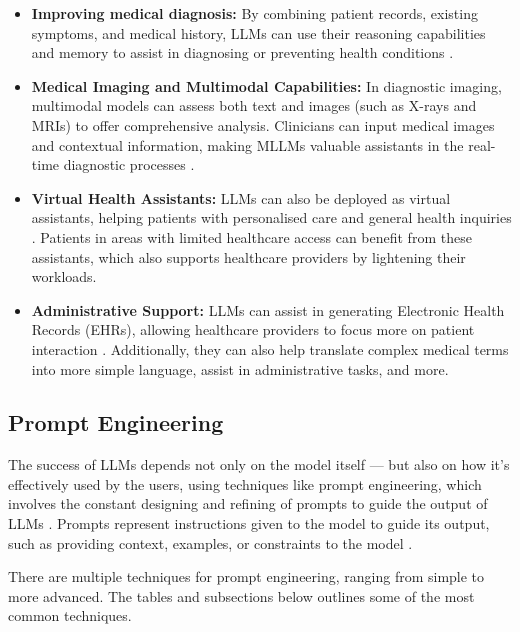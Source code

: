 \begin{itemize}
    \item \textbf{Improving medical diagnosis:} By combining patient records, existing symptoms, and medical history, LLMs can use their reasoning capabilities and memory to assist in diagnosing or preventing health conditions \parencite{llm_healthcare,llm_healthcare3,llm_healthcare4}.
    \item \textbf{Medical Imaging and Multimodal Capabilities:} In diagnostic imaging, multimodal models can assess both text and images (such as X-rays and MRIs) to offer comprehensive analysis. Clinicians can input medical images and contextual information, making MLLMs valuable assistants in the real-time diagnostic processes \parencite{llm_healthcare3}.
    \item \textbf{Virtual Health Assistants:} LLMs can also be deployed as virtual assistants, helping patients with personalised care and general health inquiries \parencite{llm_healthcare,llm_healthcare3}. Patients in areas with limited healthcare access can benefit from these assistants, which also supports healthcare providers by lightening their workloads.
    \item \textbf{Administrative Support:} LLMs can assist in generating Electronic Health Records (EHRs), allowing healthcare providers to focus more on patient interaction \parencite{llm_healthcare4}. Additionally, they can also help translate complex medical terms into more simple language, assist in administrative tasks, and more.
\end{itemize}

\subsection{Prompt Engineering}\label{sec:prompt}

The success of LLMs depends not only on the model itself --- but also on how it's effectively used by the users, using techniques like prompt engineering, which involves the constant designing and refining of prompts to guide the output of LLMs \parencite{promptmed,prompt2}. Prompts represent instructions given to the model to guide its output, such as providing context, examples, or constraints to the model \parencite{prompt,prompt1,prompt2}. 

There are multiple techniques for prompt engineering, ranging from simple to more advanced. The tables and subsections below outlines some of the most common techniques.

